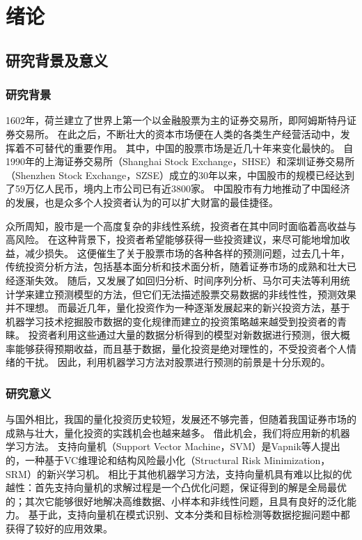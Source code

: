 
\chapter{绪论}

\section{研究背景及意义}

\subsection{研究背景}

1602年，荷兰建立了世界上第一个以金融股票为主的证券交易所，即阿姆斯特丹证券交易所。
在此之后，不断壮大的资本市场便在人类的各类生产经营活动中，发挥着不可替代的重要作用。
其中，中国的股票市场是近几十年来变化最快的。
自1990年的上海证券交易所（Shanghai Stock Exchange，SHSE）和深圳证券交易所（Shenzhen Stock Exchange，SZSE）成立的30年以来，中国股市的规模已经达到了59万亿人民币，境内上市公司已有近3800家。
中国股市有力地推动了中国经济的发展，也是众多个人投资者认为的可以扩大财富的最佳捷径。

众所周知，股市是一个高度复杂的非线性系统，投资者在其中同时面临着高收益与高风险。
在这种背景下，投资者希望能够获得一些投资建议，来尽可能地增加收益，减少损失。
这便催生了关于股票市场的各种各样的预测问题，过去几十年，传统投资分析方法，包括基本面分析\cite{cn1}和技术面分析\cite{cn2}，随着证券市场的成熟和壮大已经逐渐失效。
随后，又发展了如回归分析、时间序列分析\cite{cn3}、马尔可夫法\cite{cn4}等利用统计学来建立预测模型的方法，但它们无法描述股票交易数据的非线性性，预测效果并不理想。
而最近几年，量化投资作为一种逐渐发展起来的新兴投资方法，基于机器学习技术挖掘股市数据的变化规律而建立的投资策略越来越受到投资者的青睐。
投资者利用这些通过大量的数据分析得到的模型对新数据进行预测，很大概率能够获得预期收益，而且基于数据，量化投资是绝对理性的，不受投资者个人情绪的干扰。
因此，利用机器学习方法对股票进行预测的前景是十分乐观的。

\subsection{研究意义}

与国外相比，我国的量化投资历史较短，发展还不够完善，但随着我国证券市场的成熟与壮大，量化投资的实践机会也越来越多。
借此机会，我们将应用新的机器学习方法。
支持向量机（Support Vector Machine，SVM）是Vapnik等人提出的，一种基于VC维理论和结构风险最小化（Structural Risk Minimization，SRM）的新兴学习机\cite{en1}。
相比于其他机器学习方法，支持向量机具有难以比拟的优越性：首先支持向量机的求解过程是一个凸优化问题，保证得到的解是全局最优的；其次它能够很好地解决高维数据、小样本和非线性问题，且具有良好的泛化能力。
基于此，支持向量机在模式识别、文本分类和目标检测等数据挖掘问题中都获得了较好的应用效果。

